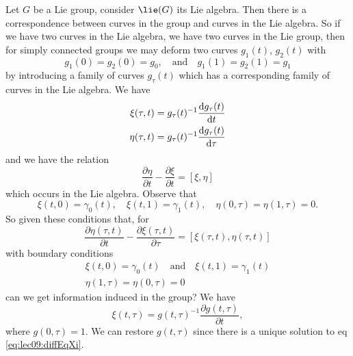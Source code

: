 
Let $G$ be a Lie group, consider $\lie(G)$ its Lie algebra. Then
there is a correspondence between curves in the group and curves
in the Lie algebra. So if we have two curves in the Lie algebra,
we have two curves in the Lie group, then for simply connected
groups we may deform two curves $g_{1}(t)$, $g_{2}(t)$ with
\begin{equation}
g_{1}(0)=g_{2}(0)=g_{0},\quad\mbox{and}\quad
g_{1}(1)=g_{2}(1)=g_{1}
\end{equation}
by introducing a family of curves $g_{\tau}(t)$ which has a
corresponding family of curves in the Lie algebra. We have
\begin{subequations}
\begin{align}
\xi(\tau,t) &= g_{\tau}(t)^{-1}\frac{\mathrm{d} g_{\tau}(t)}{\mathrm{d} t}\\
\eta(\tau,t) &= g_{\tau}(t)^{-1}\frac{\mathrm{d} g_{\tau}(t)}{\mathrm{d} \tau}
\end{align}
\end{subequations}
and we have the relation
\begin{equation}
\frac{\partial\eta}{\partial t}-\frac{\partial\xi}{\partial t}=[\xi,\eta]
\end{equation}
which occurs in the Lie algebra. Observe that 
\begin{equation}
\xi(t,0)=\gamma_{0}(t),\quad\xi(t,1)=\gamma_{1}(t),\quad\eta(0,\tau)=\eta(1,\tau)=0.
\end{equation}
So given these conditions that, for
\begin{equation}
\frac{\partial\eta(\tau,t)}{\partial t}-\frac{\partial\xi(\tau,t)}{\partial\tau}
=[\xi(\tau,t),\eta(\tau,t)]
\end{equation}
with boundary conditions
\begin{subequations}
\begin{align}
\xi(t,0)=\gamma_{0}(t)\quad\mbox{and}\quad\xi(t,1)=\gamma_{1}(t)\\
\eta(1,\tau)=\eta(0,\tau)=0
\end{align}
\end{subequations}
can we get information induced in the group? We have
\begin{equation}\label{eq:lec09:diffEqXi}
\xi(t,\tau)=g(t,\tau)^{-1}\frac{\partial g(t,\tau)}{\partial t},
\end{equation}
where $g(0,\tau)=1$. We can restore $g(t,\tau)$ since there is a
unique solution to eq \eqref{eq:lec09:diffEqXi}.

